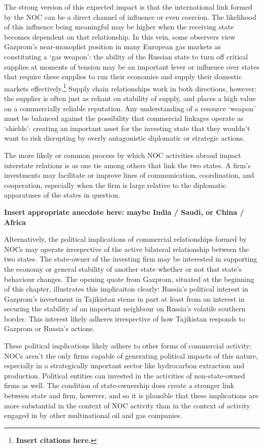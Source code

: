 \documentclass[11pt,]{book}
\begin{document}
The strong version of this expected impact is that the international link formed by the NOC can be a direct channel of influence or even coercion. The likelihood of this influence being meaningful may be higher when the receiving state becomes dependent on that relationship. In this vein, some observers view Gazprom's near-monoplist position in many European gas markets as constituting a `gas weapon': the ability of the Russian state to turn off critical supplies at moments of tension may be an important lever or influence over states that require these supplies to run their economies and supply their domestic markets effectively.\footnote{\textbf{Insert citations here.}} Supply chain relationships work in both directions, however: the supplier is often just as reliant on stability of supply, and places a high value on a commercially reliable reputation. Any understanding of a resource `weapon' must be balanced against the possibility that commercial linkages operate as `shields': creating an important asset for the investing state that they wouldn't want to risk disrupting by overly antagonistic diplomatic or strategic actions.

The more likely or common process by which NOC activities abroad impact interstate relations is as one tie among others that link the two states. A firm's investments may facilitate or improve lines of communication, coordination, and cooperation, especially when the firm is large relative to the diplomatic apparatuses of the states in question.

\textbf{Insert appropriate anecdote here: maybe India / Saudi, or China / Africa}

Alternatively, the political implications of commercial relationships formed by NOCs may operate irrespective of the active bilateral relationship between the two states. The state-owner of the investing firm may be interested in supporting the economy or general stability of another state whether or not that state's behaviour changes. The opening quote from Gazprom, situated at the beginning of this chapter, illustrates this implicaiton clearly: Russia's political interest in Gazprom's investment in Tajikistan stems in part at least from an interest in securing the stability of an important neighbour on Russia's volatile southern border. This interest likely adheres irrespective of how Tajikistan responds to Gazprom or Russia's actions.

These political implications likely adhere to other forms of commercial activity: NOCs aren't the only firms capable of generating political impacts of this nature, especially in a strategically important sector like hydrocarbon extraction and production. Political entities can invested in the activities of non-state-owned firms as well. The condition of state-ownership does create a stronger link between state and firm, however, and so it is plausible that these implications are more substantial in the context of NOC activity than in the context of activity engaged in by other multinational oil and gas companies.
\end{document}
